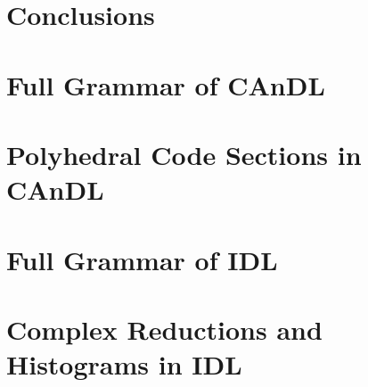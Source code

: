 \documentclass[phd,icsa,twoside,logo,11pt]{infthesis}
\begin{document}
%    

\chapter{Conclusions}
    \label{chapter:conclusion}
    




\begin{appendices}
\chapter{Full Grammar of CAnDL}
    \label{appendix:CAnDLgrammar}
    
\chapter{Polyhedral Code Sections in CAnDL}
    \label{appendix:CAnDLpoly}
    
\chapter{Full Grammar of IDL}
    \label{appendix:IDLgrammar}
    
\chapter{Complex Reductions and Histograms in IDL}
    \label{appendix:IDLreductions}
    
\end{appendices}
\end{document}
